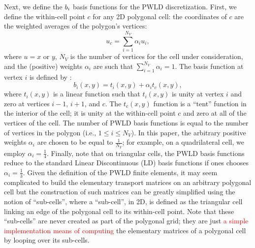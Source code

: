 Next, we define the $b_i$ basis functions for the PWLD discretization. First, we
define the within-cell point $c$ for any 2D polygonal cell: the coordinates 
of $c$ are the weighted averages of the polygon's vertices:
\begin{equation}
  u_c = \sum_{i=1}^{N_V} \alpha_i u_i,
\end{equation}
where $u=x$ or $y$, $N_V$ is the number of vertices for the cell under
consideration, and the (positive) weights $\alpha_i$ are such that $\sum_{i=1}^{N_V} \alpha_i =1$. 
The basis function at vertex $i$ is defined by 
\cite{pwld_2d}:
\begin{equation}
  b_i(x,y) = t_i(x,y) + \alpha_i t_c(x,y),
\end{equation}
where $t_i(x,y)$ is a linear function such that $t_i(x,y)$ is unity at vertex
$i$ and zero at vertices $i-1$, $i+1$, and $c$. The $t_c(x,y)$ function is a ``tent''
function in the interior of the cell; it is unity at the within-cell point $c$
and zero at all of the vertices of the cell. The number of PWLD basis functions is 
equal to the number of vertices in the polygon (i.e., $1 \le i \le N_V$). In this paper, the arbitrary
positive weights $\alpha_i$ are chosen to be equal to $\frac{1}{N_V}$; for example, on a
quadrilateral cell, we employ $\alpha_i =\frac{1}{4}$. Finally, note that on
triangular cells, the PWLD basis functions reduce to the
standard Linear Discontinuous (LD) basis functions if ones chooses $\alpha_i = \frac{1}{3}$. 
Given the definition of the PWLD
finite elements, it may seem complicated to build the elementary transport 
matrices on an arbitrary polygonal cell but the construction of such matrices
can be greatly simplified using the notion of ``sub-cells'', where a ``sub-cell'',
in 2D, is defined as the triangular cell linking an edge of the polygonal cell to its
within-cell point. Note that these ``sub-cells'' are never created as part of the 
polygonal grid; they are just \textcolor{red}{a simple implementation means of computing}
the elementary matrices of a polygonal cell by looping over its sub-cells. 
